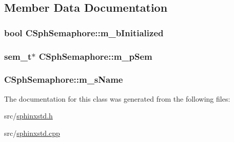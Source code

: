 \subsection{Member Data Documentation}
\hypertarget{classCSphSemaphore_ac11c8343b8e40ad79df4ee44fa16a457}{
\subsubsection[{m\-\_\-b\-Initialized}]{\setlength{\rightskip}{0pt plus 5cm}bool C\-Sph\-Semaphore\-::m\-\_\-b\-Initialized\hspace{0.3cm}{\ttfamily [protected]}}}\label{classCSphSemaphore_ac11c8343b8e40ad79df4ee44fa16a457}
\hypertarget{classCSphSemaphore_a98492f0e838ab3d069ae81de77cb1e3c}{
\subsubsection[{m\-\_\-p\-Sem}]{\setlength{\rightskip}{0pt plus 5cm}sem\-\_\-t$\ast$ C\-Sph\-Semaphore\-::m\-\_\-p\-Sem\hspace{0.3cm}{\ttfamily [protected]}}}\label{classCSphSemaphore_a98492f0e838ab3d069ae81de77cb1e3c}
\hypertarget{classCSphSemaphore_ac52319af197003fba722956df74f0ab9}{
\subsubsection[{m\-\_\-s\-Name}]{ C\-Sph\-Semaphore\-::m\-\_\-s\-Name\hspace{0.3cm}{\ttfamily [protected]}}}\label{classCSphSemaphore_ac52319af197003fba722956df74f0ab9}


The documentation for this class was generated from the following files\-:\begin{DoxyCompactItemize}
\item 
src/\hyperlink{sphinxstd_8h}{sphinxstd.\-h}\item 
src/\hyperlink{sphinxstd_8cpp}{sphinxstd.\-cpp}\end{DoxyCompactItemize}
